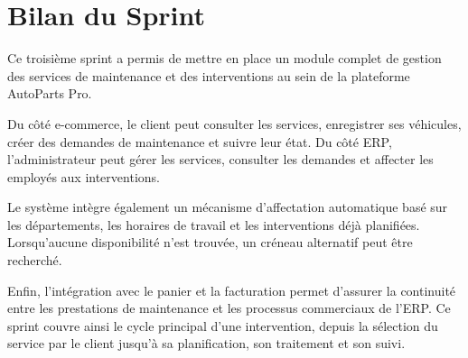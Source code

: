 \section{Bilan du Sprint}

Ce troisième sprint a permis de mettre en place un module complet de gestion des services de maintenance et des interventions au sein de la plateforme AutoParts Pro.

Du côté e-commerce, le client peut consulter les services, enregistrer ses véhicules, créer des demandes de maintenance et suivre leur état. Du côté ERP, l'administrateur peut gérer les services, consulter les demandes et affecter les employés aux interventions.

Le système intègre également un mécanisme d'affectation automatique basé sur les départements, les horaires de travail et les interventions déjà planifiées. Lorsqu'aucune disponibilité n'est trouvée, un créneau alternatif peut être recherché.

Enfin, l'intégration avec le panier et la facturation permet d'assurer la continuité entre les prestations de maintenance et les processus commerciaux de l'ERP. Ce sprint couvre ainsi le cycle principal d'une intervention, depuis la sélection du service par le client jusqu'à sa planification, son traitement et son suivi.
